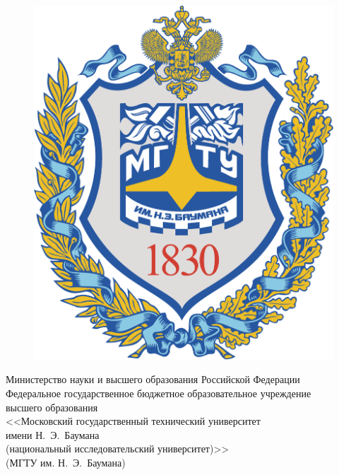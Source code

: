 \begin{titlepage}
	
	\centering
	
	\begin{figure}
		\vspace{3.4mm}
		\hspace{-8mm}
		\includegraphics[width=0.89\linewidth]{assets/bmstu-logo}
	\end{figure}
	
	{
		\singlespacing \small {}\selectfont
		Министерство науки и высшего образования Российской Федерации \\
		Федеральное государственное бюджетное образовательное учреждение \\
		высшего образования \\
		<<Московский государственный технический университет \\
		имени Н.~Э.~Баумана \\
		(национальный исследовательский университет)>> \\
		(МГТУ им. Н.~Э.~Баумана) \\
	}
	
	\vspace{-4.2mm}
	\vhrulefill{0.2mm} \\
	\vspace{-6mm}
	\vhrulefill{0.9mm} \\
	\vspace{2.8mm}
	

\end{titlepage}
